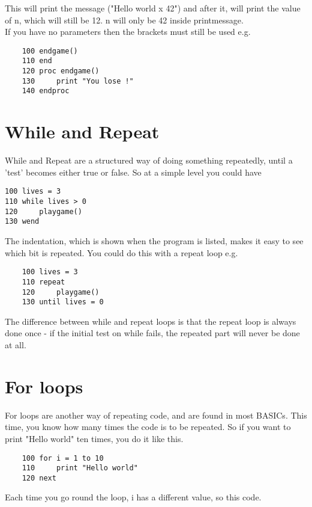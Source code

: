 This will print the message ("Hello world x 42") and after it, will print the value of n, which will still be 12. n will only be 42 inside printmessage.\\

If you have no parameters then the brackets must still be used e.g. 

\begin{verbatim}
	100 endgame()
	110 end
	120 proc endgame()
	130 	print "You lose !"
	140 endproc
\end{verbatim}

\section{While and Repeat}

While and Repeat are a structured way of doing something repeatedly, until a 'test' becomes either true or false. So at a simple level you could have

\begin{verbatim}
100 lives = 3
110 while lives > 0
120 	playgame()
130 wend
\end{verbatim}

The indentation, which is shown when the program is listed, makes it easy to see which bit is repeated. You could do this with a repeat loop e.g.

\begin{verbatim}
	100 lives = 3
	110 repeat
	120 	playgame()
	130 until lives = 0
\end{verbatim}

The difference between while and repeat loops is that the repeat loop is always done once - if the initial test on while fails, the repeated part will never be done at all. 

\section{For loops }

For loops are another way of repeating code, and are found in most BASICs. This time, you know how many times the code is to be repeated. So if you want to print "Hello world" ten times, you do it like this.

\begin{verbatim}
	100 for i = 1 to 10
	110 	print "Hello world"
	120	next
\end{verbatim}

Each time you go round the loop, i has a different value, so this code.

